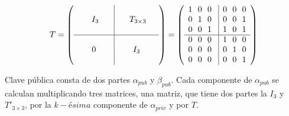 \begin{equation}\label{eq:ej-T}
{T} =
	\left(\begin{array}{c|c}
	\\
	\ \ \ \ \ I_3\ \ \ \ & \ \ \ \ T_{3\times 3} \ \ \  \\
	\\
	\hline
	\\
	0 & I_3\\
	\\
	\end{array}\right) =
	\left(\begin{array}{c|c}
		1\ \ 0\ \ 0\ & 0\ \ 0\ \ 0\\
		0\ \ 1\ \ 0\ & 0\ \ 0\ \ 1\\
		0\ \ 0\ \ 1\ & 1\ \ 0\ \ 1\\
		\hline
		0\ \ 0\ \ 0\ & 1\ \ 0\ \ 0\\
		0\ \ 0\ \ 0\ & 0\ \ 1\ \ 0\\
		0\ \ 0\ \ 0\ & 0\ \ 0\ \ 1
	\end{array}\right)
\end{equation}


Clave pública consta de dos partes $\alpha_{pub}$ y $\beta_{pub}$. Cada  componente de $\alpha_{pub}$ se calculan multiplicando tres matrices, una matriz, que tiene dos partes la $I_3$ y $T'_{3\times 3}$, por la $k-ésima$ componente de $\alpha_{priv}$ y por $T$.

